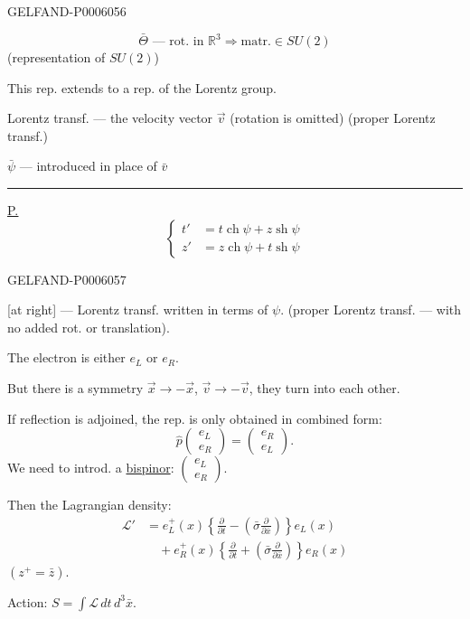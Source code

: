 \begin{GelfandAdjacentEvidence}{GELFAND-P000605}{6}

\[
\bar\Theta\text{ — rot. in }\mathbb R^3\Longrightarrow\text{matr.}\in SU(2)
\]
(representation of \(SU(2)\))

This rep. extends to a rep. of the Lorentz group.

Lorentz transf. — the velocity vector \(\vec v\) (rotation is omitted)
(proper Lorentz transf.)

 \(\bar\psi\) — introduced in place of \(\bar v\)

\rule{.28\linewidth}{.4pt}\par
\underline{\underline{P.}}
\[
\left\{\begin{aligned}
t'&=t\operatorname{ch}\psi+z\operatorname{sh}\psi\\
z'&=z\operatorname{ch}\psi+t\operatorname{sh}\psi
\end{aligned}\right.
\]
\end{GelfandAdjacentEvidence}
\begin{GelfandAdjacentEvidence}{GELFAND-P000605}{7}

[at right] — Lorentz transf. written in terms of \(\psi\).
(proper Lorentz transf. — with no added rot. or translation).

The electron is either \(e_L\) or \(e_R\).

But there is a symmetry \(\vec x\longrightarrow-\vec x\), \(\vec v\longrightarrow-\vec v\), they turn into each other.

If reflection is adjoined, the rep. is only obtained in combined form:
\[
\hat p\begin{pmatrix}e_L\\e_R\end{pmatrix}
=\begin{pmatrix}e_R\\e_L\end{pmatrix}.
\]
We need to introd. a \underline{bispinor}: \(\begin{pmatrix}e_L\\e_R\end{pmatrix}\).

Then the Lagrangian density:
\[
\begin{aligned}
\mathcal L'&=e_L^+(x)\left\{\frac{\partial}{\partial t}
-\left(\bar\sigma\frac{\partial}{\partial\bar x}\right)\right\}e_L(x)\\
&\quad+e_R^+(x)\left\{\frac{\partial}{\partial t}
+\left(\bar\sigma\frac{\partial}{\partial\bar x}\right)\right\}e_R(x)
\end{aligned}
\]
\((z^+=\bar z)\).

Action: \(S=\int\mathcal L\,dt\,d^3\bar x\).
\end{GelfandAdjacentEvidence}



